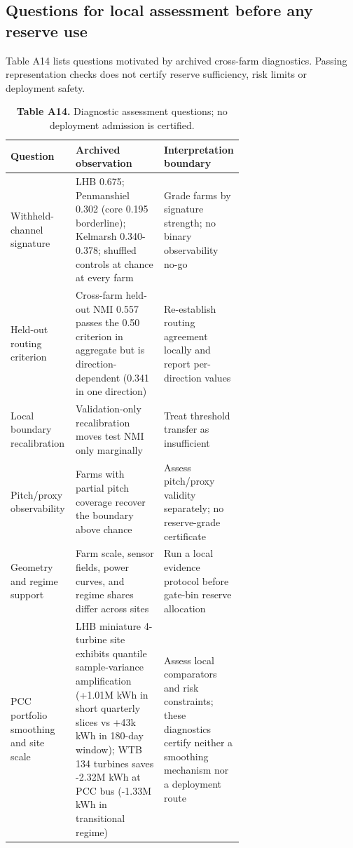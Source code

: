 \documentclass[
  journal]{IEEEtran}
\begin{document}
\FloatBarrier

\subsection*{Questions for local assessment before any reserve
use}\label{questions-for-local-assessment-before-any-reserve-use}

Table A14 lists questions motivated by archived cross-farm diagnostics.
Passing representation checks does not certify reserve sufficiency, risk
limits or deployment safety.

\begin{table}[!t]
\centering
\fontsize{8.0pt}{9.6pt}\selectfont
\setlength{\tabcolsep}{2.0pt}
\renewcommand{\arraystretch}{1.05}
\caption*{\textbf{Table A14.} Diagnostic assessment questions; no deployment admission is certified.}
%
\begin{tabularx}{\linewidth}{>{\raggedright\arraybackslash}p{0.28\linewidth} >{\raggedright\arraybackslash}p{0.38\linewidth} >{\raggedright\arraybackslash}X}
\toprule
Question & Archived observation & Interpretation boundary \\
\midrule
Withheld-channel signature & LHB 0.675; Penmanshiel 0.302 (core 0.195 borderline); Kelmarsh 0.340-0.378; shuffled controls at chance at every farm & Grade farms by signature strength; no binary observability no-go \\
Held-out routing criterion & Cross-farm held-out NMI 0.557 passes the 0.50 criterion in aggregate but is direction-dependent (0.341 in one direction) & Re-establish routing agreement locally and report per-direction values \\
Local boundary recalibration & Validation-only recalibration moves test NMI only marginally & Treat threshold transfer as insufficient \\
Pitch/proxy observability & Farms with partial pitch coverage recover the boundary above chance & Assess pitch/proxy validity separately; no reserve-grade certificate \\
Geometry and regime support & Farm scale, sensor fields, power curves, and regime shares differ across sites & Run a local evidence protocol before gate-bin reserve allocation \\
PCC portfolio smoothing and site scale & LHB miniature 4-turbine site exhibits quantile sample-variance amplification (+1.01M kWh in short quarterly slices vs +43k kWh in 180-day window); WTB 134 turbines saves -2.32M kWh at PCC bus (-1.33M kWh in transitional regime) & Assess local comparators and risk constraints; these diagnostics certify neither a smoothing mechanism nor a deployment route \\
\bottomrule
\end{tabularx}
\end{table}
\end{document}
